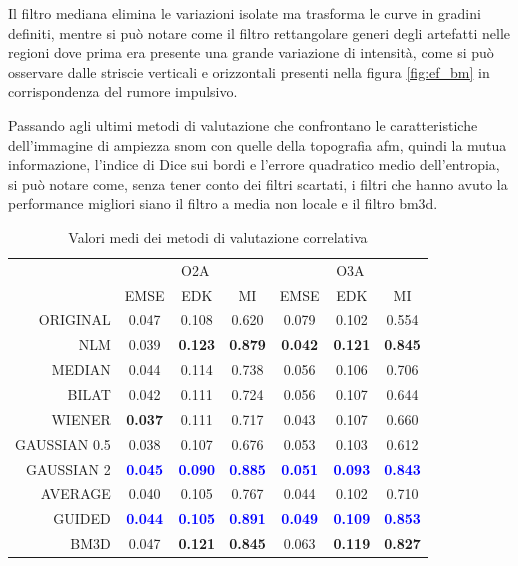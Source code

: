 \documentclass[../main.tex]{subfiles}
\begin{document}
Il filtro mediana elimina le variazioni isolate ma trasforma le curve in gradini definiti, mentre si può notare come il filtro rettangolare generi degli artefatti nelle regioni dove prima era presente una grande variazione di intensità, come si può osservare dalle striscie verticali e orizzontali presenti nella figura \ref{fig:ef_bm} in corrispondenza del rumore impulsivo.

Passando agli ultimi metodi di valutazione che confrontano le caratteristiche dell'immagine di ampiezza \acrshort{snom} con quelle della topografia \acrshort{afm}, quindi la mutua informazione, l'indice di Dice sui bordi e l'errore quadratico medio dell'entropia, si può notare come, senza tener conto dei filtri scartati, i filtri che hanno avuto la performance migliori siano il filtro a media non locale e il filtro \acrshort{bm3d}.\medskip

\begin{table}[ht]
	\centering
	\begin{tabular}{r||ccc||ccc}
		& \multicolumn{3}{c||}{O2A} & \multicolumn{3}{c}{O3A} \\
		& EMSE & EDK & MI & EMSE & EDK & MI \\
		\hline\hline
		ORIGINAL     & 0.047 & 0.108 & 0.620 & 0.079 & 0.102 & 0.554 \\
		NLM          & 0.039 & \textbf{0.123} & \textbf{0.879} & \textbf{0.042} & \textbf{0.121} & \textbf{0.845} \\
		MEDIAN       & 0.044 & 0.114 & 0.738 & 0.056 & 0.106 & 0.706 \\
		BILAT        & 0.042 & 0.111 & 0.724 & 0.056 & 0.107 & 0.644 \\
		WIENER       & \textbf{0.037} & 0.111 & 0.717 & 0.043 & 0.107 & 0.660 \\
		GAUSSIAN 0.5 & 0.038 & 0.107 & 0.676 & 0.053 & 0.103 & 0.612 \\
		GAUSSIAN 2   & \textcolor{blue}{\textbf{0.045}} & \textcolor{blue}{\textbf{0.090}} & \textcolor{blue}{\textbf{0.885}} & \textcolor{blue}{\textbf{0.051}} & \textcolor{blue}{\textbf{0.093}} & \textcolor{blue}{\textbf{0.843}} \\
		AVERAGE      & 0.040 & 0.105 & 0.767 & 0.044 & 0.102 & 0.710 \\
		GUIDED       & \textcolor{blue}{\textbf{0.044}} & \textcolor{blue}{\textbf{0.105}} & \textcolor{blue}{\textbf{0.891}} & \textcolor{blue}{\textbf{0.049}} & \textcolor{blue}{\textbf{0.109}} & \textcolor{blue}{\textbf{0.853}} \\
		BM3D         & 0.047 & \textbf{0.121} & \textbf{0.845} & 0.063 & \textbf{0.119} & \textbf{0.827}
	\end{tabular}
	\caption{Valori medi dei metodi di valutazione correlativa}
\end{table}
\end{document}
